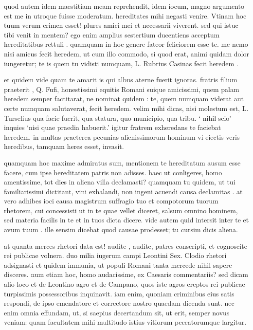  quod autem idem maestitiam meam reprehendit, idem iocum, magno argumento est me in utroque fuisse moderatum. hereditates mihi negasti venire. Vtinam hoc tuum verum crimen esset! plures amici mei et necessarii viverent. sed qui istuc tibi venit in mentem? ego enim amplius sestertium ducentiens acceptum hereditatibus rettuli . quamquam in hoc genere fateor feliciorem esse te. me nemo nisi amicus fecit heredem, ut cum illo commodo, si quod erat, animi quidam dolor iungeretur; te is quem tu vidisti numquam, L. Rubrius Casinas fecit heredem .

 et quidem vide quam te amarit is qui albus aterne fuerit ignoras. fratris filium praeterit , Q. Fufi, honestissimi equitis Romani suique amicissimi, quem palam heredem semper factitarat, ne nominat quidem : te, quem numquam viderat aut certe numquam salutaverat, fecit heredem. velim mihi dicas, nisi molestum est, L. Turselius qua facie fuerit, qua statura, quo municipio, qua tribu. ` nihil scio' inquies `nisi quae praedia habuerit.' igitur fratrem exheredans te faciebat heredem. in multas praeterea pecunias alienissimorum hominum vi eiectis veris heredibus, tamquam heres esset, invasit.

 quamquam hoc maxime admiratus sum, mentionem te hereditatum ausum esse facere, cum ipse hereditatem patris non adisses. haec ut conligeres, homo amentissime, tot dies in aliena villa declamasti? quamquam tu quidem, ut tui familiarissimi dictitant, vini exhalandi, non ingeni acuendi causa declamitas . at vero adhibes ioci causa magistrum suffragio tuo et compotorum tuorum rhetorem, cui concessisti ut in te quae vellet diceret, salsum omnino hominem, sed materia facilis in te et in tuos dicta dicere. vide autem quid intersit inter te et avum tuum . ille sensim dicebat quod causae prodesset; tu cursim dicis aliena.

 at quanta merces rhetori data est! audite , audite, patres conscripti, et cognoscite rei publicae volnera. duo milia iugerum campi Leontini Sex. Clodio rhetori adsignasti et quidem immunia, ut populi Romani tanta mercede nihil sapere disceres. num etiam hoc, homo audacissime, ex Caesaris commentariis? sed dicam alio loco et de Leontino agro et de Campano, quos iste agros ereptos rei publicae turpissimis possessoribus inquinavit. iam enim, quoniam criminibus eius satis respondi, de ipso emendatore et correctore nostro quaedam dicenda sunt. nec enim omnia effundam, ut, si saepius decertandum sit, ut erit, semper novus veniam: quam facultatem mihi multitudo istius vitiorum peccatorumque largitur.

